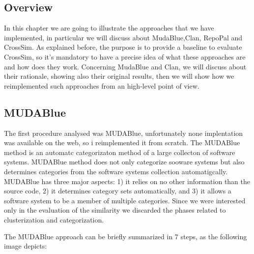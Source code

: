 \subsection{Overview}
In this chapter we are going to illustrate the approaches that we have implemented, in particular we will discuss about MudaBlue,Clan, RepoPal and CrossSim. As explained before, the purpose is to provide a baseline to evaluate CrossSim, so it's mandatory to have a precise idea of what these approaches are and how does they work. Concerning MudaBlue and Clan, we will discuss about their rationale, showing also their original results, then we will show how we reimplemented such approaches from an high-level point of view.


\subsection{MUDABlue}\label{sec:mudablue}

The first procedure analysed was MUDABlue, unfortunately none implentation was available on the web, so i reimplemented it from scratch. The MUDABlue method is an automatc categorizaton method of a large collecton of software systems. MUDABlue method does not only categorize sooware systems but also determines categories from the software systems collection automatigcally. MUDABlue has three major aspects: 1) it relies on no other information than the source code, 2) it determines category sets automatically, and 3) it allows a software system to be a member of multiple categories. Since we were interested only in the evaluation of the similarity we discarded the phases related to clusterization and categorization.

The MUDABlue approach can be briefly summarized in 7 steps, as the following image depicts:

